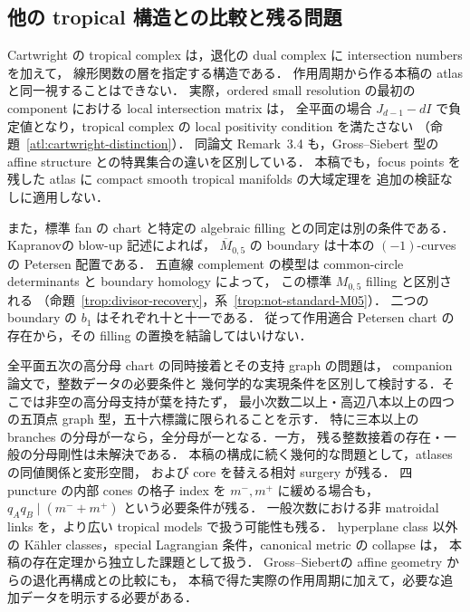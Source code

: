 \subsection{他の tropical 構造との比較と残る問題}

Cartwright の tropical complex は，退化の dual complex に intersection numbers を加えて，
線形関数の層を指定する構造である\cite[Definitions~2.5, 2.8; Construction~3.2]{CartwrightComplexes}．
作用周期から作る本稿の atlas と同一視することはできない．
実際，ordered small resolution の最初の component における local intersection matrix は，
全平面の場合 $J_{d-1}-dI$ で負定値となり，tropical complex の local positivity condition を満たさない
（命題~\ref{atl:cartwright-distinction}）．
同論文 Remark~3.4 も，Gross--Siebert 型の affine structure との特異集合の違いを区別している．
本稿でも，focus points を残した atlas に compact smooth tropical manifolds の大域定理を
追加の検証なしに適用しない．

また，標準 fan の chart と特定の algebraic filling との同定は別の条件である．
Kapranov\cite[Theorem~4.3.3]{KapranovChow}の blow-up 記述によれば，
$\overline M_{0,5}$ の boundary は十本の $(-1)$-curves の Petersen 配置である．
五直線 complement の模型は common-circle determinants と boundary homology によって，
この標準 $M_{0,5}$ filling と区別される
（命題~\ref{trop:divisor-recovery}，系~\ref{trop:not-standard-M05}）．
二つの boundary の $b_1$ はそれぞれ十と十一である．
従って作用適合 Petersen chart の存在から，その filling の置換を結論してはいけない．

全平面五次の高分母 chart の同時接着とその支持 graph の問題は，
companion 論文\cite{QuinticArithmetic}で，整数データの必要条件と
幾何学的な実現条件を区別して検討する．そこでは非空の高分母支持が葉を持たず，
最小次数二以上・高辺八本以上の四つの五頂点 graph 型，五十六標識に限られることを示す．
特に三本以上の branches の分母が一なら，全分母が一となる．一方，
残る整数接着の存在・一般の分母剛性は未解決である．
本稿の構成に続く幾何的な問題として，atlases の同値関係と変形空間，
および core を替える相対 surgery が残る．
四 puncture の内部 cones の格子 index を $m^-,m^+$ に緩める場合も，
$q_Aq_B\mid(m^-+m^+)$ という必要条件が残る．
一般次数における非 matroidal links を，より広い tropical models で扱う可能性も残る．
hyperplane class 以外の Kähler classes，special Lagrangian 条件，canonical metric の collapse は，
本稿の存在定理から独立した課題として扱う．
Gross--Siebert\cite{GrossSiebert}の affine geometry からの退化再構成との比較にも，
本稿で得た実際の作用周期に加えて，必要な追加データを明示する必要がある．

